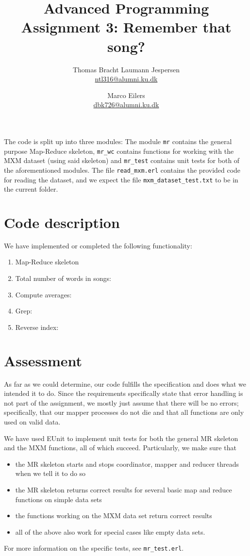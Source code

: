 \documentclass[a4paper]{article}
\title{Advanced Programming\\ Assignment 3: Remember that song?}
\author{Thomas Bracht Laumann Jespersen\\ \url{ntl316@alumni.ku.dk} \and Marco Eilers\\ \url{dbk726@alumni.ku.dk} }
\begin{document}
\maketitle

The code is split up into three modules: The module \texttt{mr}
 contains the general purpose Map-Reduce skeleton, \texttt{mr\_wc} contains functions for working with the MXM dataset
 (using said skeleton) and \texttt{mr\_test} contains
  unit tests for both of the aforementioned modules. The file \texttt{read\_mxm.erl} contains the provided code for reading the dataset, and we expect the file \texttt{mxm\_dataset\_test.txt} to be in the current folder.

\section*{Code description}
We have implemented or completed the following functionality:
\begin{enumerate}
\item Map-Reduce skeleton
\item Total number of words in songs:
\item Compute averages:
\item Grep:
\item Reverse index:
\end{enumerate}

\section*{Assessment}
As far as we could determine, our code fulfills the specification and does what we intended it to do. Since the requirements specifically state that error handling is not part of the assignment, we mostly just assume that there will be no errors; specifically, that our mapper processes do not die and that all functions are only used on valid data.

We have used EUnit to implement unit tests for both the general MR skeleton and the MXM functions, all of which succeed. Particularly, we make sure that
\begin{itemize}
  \item the MR skeleton starts and stops coordinator, mapper and reducer threads when we tell it to do so
  \item the MR skeleton returns correct results for several basic map and reduce functions on simple data sets
  \item the functions working on the MXM data set return correct results
  \item all of the above also work for special cases like empty data sets.
\end{itemize}
For more information on the specific tests, see \texttt{mr\_test.erl}.
\end{document}
